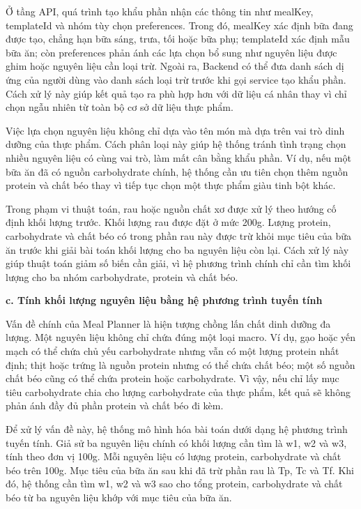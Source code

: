 \documentclass[12pt, a4paper]{report}
\begin{document}
Ở tầng API, quá trình tạo khẩu phần nhận các thông tin như mealKey, templateId và nhóm tùy chọn preferences. Trong đó, mealKey xác định bữa đang được tạo, chẳng hạn bữa sáng, trưa, tối hoặc bữa phụ; templateId xác định mẫu bữa ăn; còn preferences phản ánh các lựa chọn bổ sung như nguyên liệu được ghim hoặc nguyên liệu cần loại trừ. Ngoài ra, Backend có thể đưa danh sách dị ứng của người dùng vào danh sách loại trừ trước khi gọi service tạo khẩu phần. Cách xử lý này giúp kết quả tạo ra phù hợp hơn với dữ liệu cá nhân thay vì chỉ chọn ngẫu nhiên từ toàn bộ cơ sở dữ liệu thực phẩm.

Việc lựa chọn nguyên liệu không chỉ dựa vào tên món mà dựa trên vai trò dinh dưỡng của thực phẩm. Cách phân loại này giúp hệ thống tránh tình trạng chọn nhiều nguyên liệu có cùng vai trò, làm mất cân bằng khẩu phần. Ví dụ, nếu một bữa ăn đã có nguồn carbohydrate chính, hệ thống cần ưu tiên chọn thêm nguồn protein và chất béo thay vì tiếp tục chọn một thực phẩm giàu tinh bột khác.

Trong phạm vi thuật toán, rau hoặc nguồn chất xơ được xử lý theo hướng cố định khối lượng trước. Khối lượng rau được đặt ở mức 200g. Lượng protein, carbohydrate và chất béo có trong phần rau này được trừ khỏi mục tiêu của bữa ăn trước khi giải bài toán khối lượng cho ba nguyên liệu còn lại. Cách xử lý này giúp thuật toán giảm số biến cần giải, vì hệ phương trình chính chỉ cần tìm khối lượng cho ba nhóm carbohydrate, protein và chất béo.

\textbf{c. Tính khối lượng nguyên liệu bằng hệ phương trình tuyến tính}

Vấn đề chính của Meal Planner là hiện tượng chồng lấn chất dinh dưỡng đa lượng. Một nguyên liệu không chỉ chứa đúng một loại macro. Ví dụ, gạo hoặc yến mạch có thể chứa chủ yếu carbohydrate nhưng vẫn có một lượng protein nhất định; thịt hoặc trứng là nguồn protein nhưng có thể chứa chất béo; một số nguồn chất béo cũng có thể chứa protein hoặc carbohydrate. Vì vậy, nếu chỉ lấy mục tiêu carbohydrate chia cho lượng carbohydrate của thực phẩm, kết quả sẽ không phản ánh đầy đủ phần protein và chất béo đi kèm.

Để xử lý vấn đề này, hệ thống mô hình hóa bài toán dưới dạng hệ phương trình tuyến tính. Giả sử ba nguyên liệu chính có khối lượng cần tìm là w1, w2 và w3, tính theo đơn vị 100g. Mỗi nguyên liệu có lượng protein, carbohydrate và chất béo trên 100g. Mục tiêu của bữa ăn sau khi đã trừ phần rau là Tp, Tc và Tf. Khi đó, hệ thống cần tìm w1, w2 và w3 sao cho tổng protein, carbohydrate và chất béo từ ba nguyên liệu khớp với mục tiêu của bữa ăn.
\end{document}

